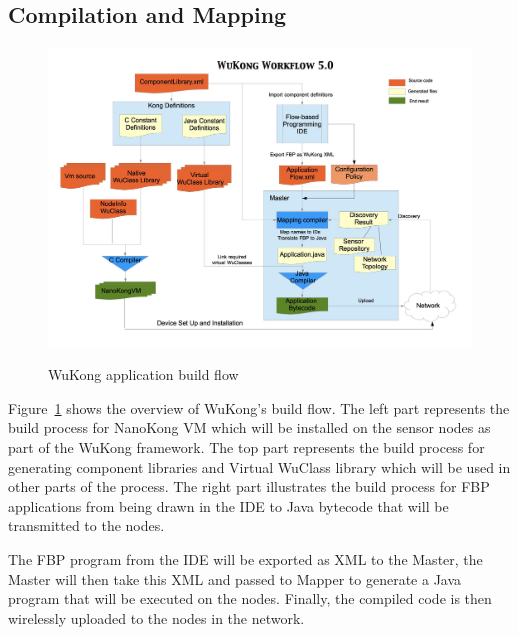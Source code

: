 \subsection{Compilation and Mapping}

\begin{figure}[h!]
\caption{WuKong application build flow}
\centering
    \includegraphics[width=\linewidth]{figures/wukong-flow}
\label{fig:wukong-flow}
\end{figure}

Figure~\ref{fig:wukong-flow} shows the overview of WuKong's build flow. The
left part represents the build process for NanoKong VM which will be installed
on the sensor nodes as part of the WuKong framework. The top part represents
the build process for generating component libraries and Virtual WuClass
library which will be used in other parts of the process. The right part
illustrates the build process for FBP applications from being drawn in the IDE
to Java bytecode that will be transmitted to the nodes.

The FBP program from the IDE will be exported as XML to the Master, the Master
will then take this XML and passed to Mapper to generate a Java program that
will be executed on the nodes. Finally, the compiled code is then wirelessly
uploaded to the nodes in the network.

